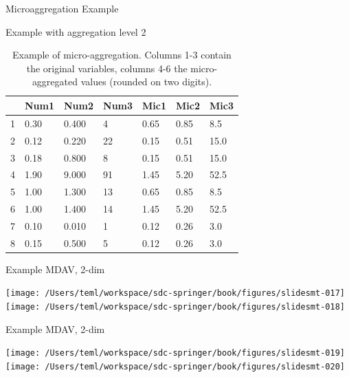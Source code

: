 \documentclass[ignorenonframetext,]{beamer}
\begin{document}
\begin{frame}{Microaggregation Example}
\protect\hypertarget{microaggregation-example}{}

Example with aggregation level 2

\begin{small}
\begin{table}[ht]
\centering
\caption{Example of micro-aggregation. Columns 1-3 contain the original variables, columns 4-6 the micro-aggregated values (rounded on two digits).} 
\label{listingMicroaggregation}
\begin{tabular}{|l|lll|lll|}
  \hline
 & Num1 & Num2 & Num3 & Mic1 & Mic2 & Mic3 \\ 
  \hline
1 & 0.30 & 0.400 & 4 & 0.65 & 0.85 & 8.5 \\ 
  2 & 0.12 & 0.220 & 22 & 0.15 & 0.51 & 15.0 \\ 
  3 & 0.18 & 0.800 & 8 & 0.15 & 0.51 & 15.0 \\ 
  4 & 1.90 & 9.000 & 91 & 1.45 & 5.20 & 52.5 \\ 
  5 & 1.00 & 1.300 & 13 & 0.65 & 0.85 & 8.5 \\ 
  6 & 1.00 & 1.400 & 14 & 1.45 & 5.20 & 52.5 \\ 
  7 & 0.10 & 0.010 & 1 & 0.12 & 0.26 & 3.0 \\ 
  8 & 0.15 & 0.500 & 5 & 0.12 & 0.26 & 3.0 \\ 
   \hline
\end{tabular}
\end{table}
\end{small}

\end{frame}

\begin{frame}{Example MDAV, 2-dim}
\protect\hypertarget{example-mdav-2-dim}{}

\texttt{[image: /Users/teml/workspace/sdc-springer/book/figures/slidesmt-017]}
\texttt{[image: /Users/teml/workspace/sdc-springer/book/figures/slidesmt-018]}

\end{frame}

\begin{frame}{Example MDAV, 2-dim}
\protect\hypertarget{example-mdav-2-dim-1}{}

\texttt{[image: /Users/teml/workspace/sdc-springer/book/figures/slidesmt-019]}
\texttt{[image: /Users/teml/workspace/sdc-springer/book/figures/slidesmt-020]}

\end{frame}
\end{document}
